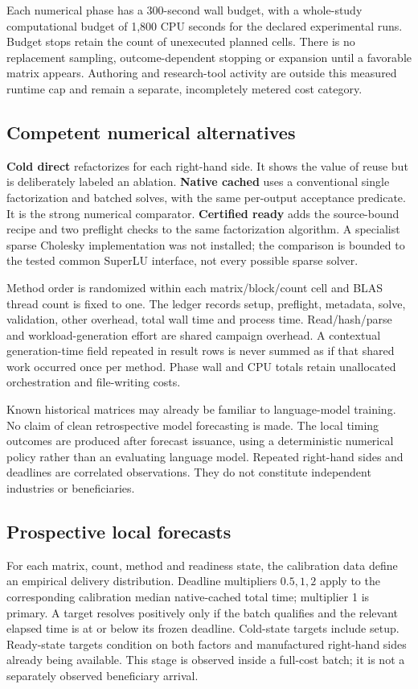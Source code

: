 \documentclass[11pt,a4paper]{article}
\begin{document}
Each numerical phase has a 300-second wall budget, with a whole-study computational budget of 1,800 CPU seconds for the declared experimental runs. Budget stops retain the count of unexecuted planned cells. There is no replacement sampling, outcome-dependent stopping or expansion until a favorable matrix appears. Authoring and research-tool activity are outside this measured runtime cap and remain a separate, incompletely metered cost category.

\subsection{Competent numerical alternatives}
\textbf{Cold direct} refactorizes for each right-hand side. It shows the value of reuse but is deliberately labeled an ablation. \textbf{Native cached} uses a conventional single factorization and batched solves, with the same per-output acceptance predicate. It is the strong numerical comparator. \textbf{Certified ready} adds the source-bound recipe and two preflight checks to the same factorization algorithm. A specialist sparse Cholesky implementation was not installed; the comparison is bounded to the tested common SuperLU interface, not every possible sparse solver.

Method order is randomized within each matrix/block/count cell and BLAS thread count is fixed to one. The ledger records setup, preflight, metadata, solve, validation, other overhead, total wall time and process time. Read/hash/parse and workload-generation effort are shared campaign overhead. A contextual generation-time field repeated in result rows is never summed as if that shared work occurred once per method. Phase wall and CPU totals retain unallocated orchestration and file-writing costs.

Known historical matrices may already be familiar to language-model training. No claim of clean retrospective model forecasting is made. The local timing outcomes are produced after forecast issuance, using a deterministic numerical policy rather than an evaluating language model. Repeated right-hand sides and deadlines are correlated observations. They do not constitute independent industries or beneficiaries.

\subsection{Prospective local forecasts}
For each matrix, count, method and readiness state, the calibration data define an empirical delivery distribution. Deadline multipliers $0.5,1,2$ apply to the corresponding calibration median native-cached total time; multiplier 1 is primary. A target resolves positively only if the batch qualifies and the relevant elapsed time is at or below its frozen deadline. Cold-state targets include setup. Ready-state targets condition on both factors and manufactured right-hand sides already being available. This stage is observed inside a full-cost batch; it is not a separately observed beneficiary arrival.
\end{document}
